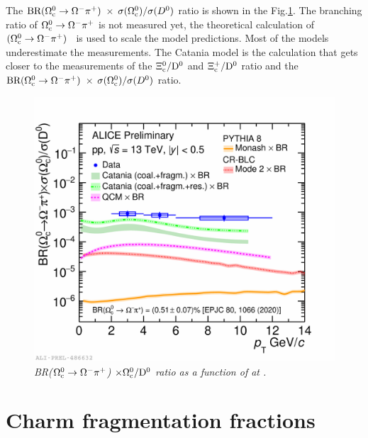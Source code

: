 The $\rm BR(\rm \Omega_c^{0} \rightarrow \Omega^{-} \pi^{+})$ $\times$ $\sigma(\Omega_{\rm c}^{0})/\sigma(D^{0})$ ratio is shown in the Fig.\ref{OcFig}.
The branching ratio of $\rm \Omega^{0}_{\rm c} \rightarrow \Omega^{-} \pi^{+}$ is not measured yet, the theoretical calculation of \BR$(\rm \Omega^{0}_{\rm c} \rightarrow \Omega^{-} \pi^{+})$~\cite{Hsiao_2020} is used to scale the model predictions.
Most of the models underestimate the measurements. The Catania model is the calculation that gets closer to the measurements of the $\rm \Xi_c^0/D^0$ and $\rm \Xi_c^{+}/D^0$ ratio and the $\rm BR(\rm \Omega_c^{0} \rightarrow \Omega^{-} \pi^{+})$ $\times$ $\sigma(\Omega_{\rm c}^{0})/\sigma(D^{0})$ ratio.
\begin{figure}[ht!]
    \centering
    \includegraphics[width=.85\textwidth]{fig/brxomegac0tod0_pp13tev_wmodel_0.pdf}
    \caption{\it BR($\rm \Omega_c^{0} \rightarrow \Omega^{-} \pi^{+}$) $\times \rm \Omega_c^0/D^0$ ratio as a function of \pt at \tevt.}
    \label{OcFig}
\end{figure}


\section{Charm fragmentation fractions}
